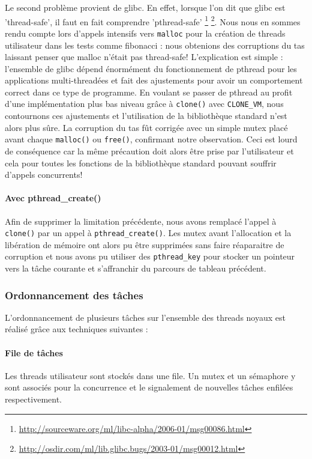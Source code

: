 Le second problème provient de glibc. En effet, lorsque l'on dit que glibc est
'thread-safe', il faut en fait comprendre 'pthread-safe'
\footnote{\url{http://sourceware.org/ml/libc-alpha/2006-01/msg00086.html}}
\footnote{\url{http://osdir.com/ml/lib.glibc.bugs/2003-01/msg00012.html}}.
Nous nous en sommes rendu compte lors d'appels intensifs vers \verb!malloc!
pour la création de threads utilisateur dans les tests comme fibonacci : nous
obtenions des corruptions du tas laissant penser que malloc n'était pas
thread-safe!  L'explication est simple : l'ensemble de glibc dépend énormément
du fonctionnement de pthread pour les applications multi-threadées et fait des
ajustements pour avoir un comportement correct dans ce type de programme. En
voulant se passer de pthread au profit d'une implémentation plus bas niveau
grâce à \verb!clone()! avec \verb!CLONE_VM!, nous contournons ces ajustements
et l'utilisation de la bibliothèque standard n'est alors plus sûre. La
corruption du tas fût corrigée avec un simple mutex placé avant chaque
\verb!malloc()! ou \verb!free()!, confirmant notre observation. Ceci est lourd
de conséquence car la même précaution doit alors être prise par l'utilisateur
et cela pour toutes les fonctions de la bibliothèque standard pouvant souffrir
d'appels concurrents!


\paragraph{Avec pthread\_create()}
Afin de supprimer la limitation précédente, nous avons remplacé l'appel à \verb!clone()! par un appel à \verb!pthread_create()!. Les mutex avant l'allocation et la libération de mémoire ont alors pu être supprimées sans faire réaparaitre de corruption et nous avons pu utiliser des \verb!pthread_key! pour stocker un pointeur vers la tâche courante et s'affranchir du parcours de tableau précédent.


\subsubsection{Ordonnancement des tâches}

L'ordonnancement de plusieurs tâches sur l'ensemble des threads noyaux est réalisé grâce aux techniques suivantes :

\paragraph{File de tâches} Les threads utilisateur sont stockés dans une file. Un mutex et un sémaphore y sont associés pour la concurrence et le signalement de nouvelles tâches enfilées respectivement.

